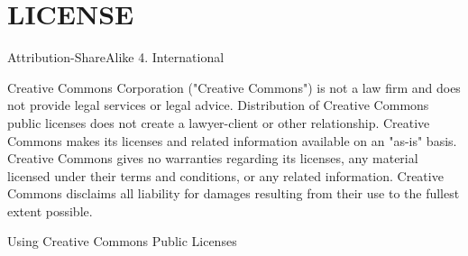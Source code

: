 \chapter{LICENSE}
\hypertarget{md__l_i_c_e_n_s_e}{}\label{md__l_i_c_e_n_s_e}
Attribution-\/\+Share\+Alike 4. International



Creative Commons Corporation ("{}\+Creative Commons"{}) is not a law firm and does not provide legal services or legal advice. Distribution of Creative Commons public licenses does not create a lawyer-\/client or other relationship. Creative Commons makes its licenses and related information available on an "{}as-\/is"{} basis. Creative Commons gives no warranties regarding its licenses, any material licensed under their terms and conditions, or any related information. Creative Commons disclaims all liability for damages resulting from their use to the fullest extent possible.

Using Creative Commons Public Licenses

